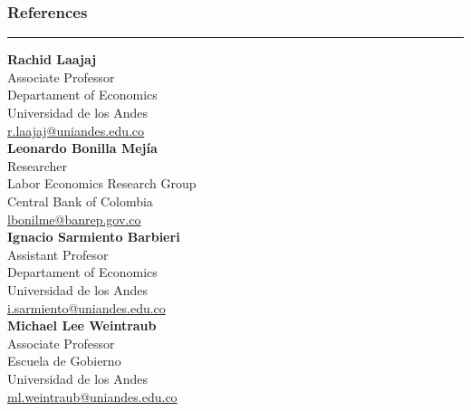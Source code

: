 \documentclass[12pt]{article}
\begin{document}

\subsubsection*{References}
\vspace{-20pt}
\rule{\textwidth}{1pt}
\begin{multicols}{2}

\textbf{Rachid Laajaj} \\
Associate Professor \\
Departament of Economics \\ Universidad de los Andes \\
\href{mailto:r.laajaj@uniandes.edu.co}{r.laajaj@uniandes.edu.co} \\

\textbf{Leonardo Bonilla Mejía} \\
Researcher \\
Labor Economics Research Group \\ Central Bank of Colombia \\
\href{mailto:lbonilme@banrep.gov.co}{lbonilme@banrep.gov.co} \\

\textbf{Ignacio Sarmiento Barbieri} \\
Assistant Profesor \\
Departament of Economics \\ Universidad de los Andes \\
\href{mailto:i.sarmiento@uniandes.edu.co}{i.sarmiento@uniandes.edu.co} \\

\textbf{Michael Lee Weintraub} \\
Associate Professor \\
Escuela de Gobierno \\ Universidad de los Andes \\
\href{mailto:ml.weintraub@uniandes.edu.co}{ml.weintraub@uniandes.edu.co} \\
\end{multicols}
\end{document}
